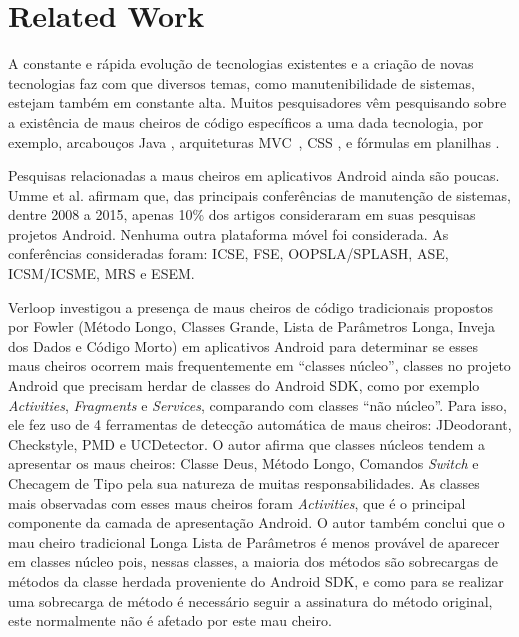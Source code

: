 \section{Related Work}


A constante e rápida evolução de tecnologias existentes e a criação de novas tecnologias faz com que diversos temas, como manutenibilidade de sistemas, estejam também em constante alta. Muitos pesquisadores vêm pesquisando sobre a existência de maus cheiros de código específicos a uma dada tecnologia, por exemplo, arcabouços Java \cite{ORMSmells}, arquiteturas MVC~\cite{AnicheSmellsMVC:17, MvcSmells:16, FinavaroAniche2016}, CSS \cite{CSSCodeSmell}, e fórmulas em planilhas \cite{SpreadsheetsSmells:12}.

Pesquisas relacionadas a maus cheiros em aplicativos Android ainda são poucas. Umme et al. \cite{Mannan_Dig_Ahmed_Jensen_Abdullah_Almurshed} afirmam que, das principais conferências de manutenção de sistemas, dentre 2008 a 2015, apenas 10\% dos artigos consideraram em suas pesquisas projetos Android. Nenhuma outra plataforma móvel foi considerada. As conferências consideradas foram: ICSE, FSE, OOPSLA/SPLASH, ASE, ICSM/ICSME, MRS e ESEM.

Verloop \cite{MobileSmells:13} investigou a presença de maus cheiros de código tradicionais propostos por Fowler \cite{Refactoring:99} (Método Longo, Classes Grande, Lista de Parâmetros Longa, Inveja dos Dados e Código Morto) em aplicativos Android para determinar se esses maus cheiros ocorrem mais frequentemente em ``classes núcleo'', classes no projeto Android que precisam herdar de classes do Android \acs{SDK}, como por exemplo \textit{Activities}, \textit{Fragments} e \textit{Services}, comparando com classes ``não núcleo''. Para isso, ele fez uso de 4 ferramentas de detecção automática de maus cheiros: JDeodorant, Checkstyle, PMD e UCDetector.
O autor afirma que classes núcleos tendem a apresentar os maus cheiros: Classe Deus, Método Longo, Comandos \textit{Switch} e Checagem de Tipo pela sua natureza de muitas responsabilidades. As classes mais observadas com esses maus cheiros foram \textit{Activities}, que é o principal componente da camada de apresentação Android. O autor também conclui que o mau cheiro tradicional Longa Lista de Parâmetros é menos provável de aparecer em classes núcleo pois, nessas classes, a maioria dos métodos são sobrecargas de métodos da classe herdada proveniente do Android SDK, e como para se realizar uma sobrecarga de método é necessário seguir a assinatura do método original, este normalmente não é afetado por este mau cheiro. 

